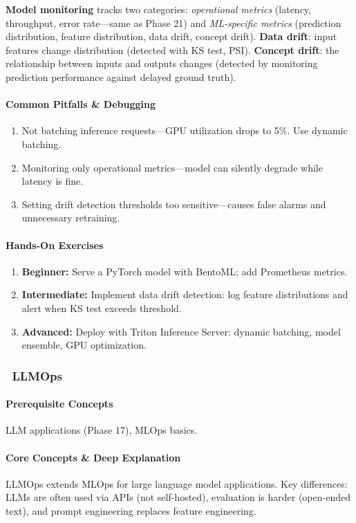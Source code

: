 \documentclass[11pt, a4paper, oneside]{report}
\newcommand{\mustmaster}[1]{\subsubsection{\texorpdfstring{\fcolorbox{blue!40!black}{blue!8}{\footnotesize\bfseries\color{blue!40!black} MUST MASTER}~#1}{#1}}}
\begin{document}
\textbf{Model monitoring} tracks two categories: \emph{operational metrics} (latency, throughput, error rate---same as Phase 21) and \emph{ML-specific metrics} (prediction distribution, feature distribution, data drift, concept drift). \textbf{Data drift}: input features change distribution (detected with KS test, PSI). \textbf{Concept drift}: the relationship between inputs and outputs changes (detected by monitoring prediction performance against delayed ground truth).

\paragraph{Common Pitfalls \& Debugging}
\begin{enumerate}[leftmargin=*]
\item Not batching inference requests---GPU utilization drops to 5\%. Use dynamic batching.
\item Monitoring only operational metrics---model can silently degrade while latency is fine.
\item Setting drift detection thresholds too sensitive---causes false alarms and unnecessary retraining.
\end{enumerate}

\paragraph{Hands-On Exercises}
\begin{enumerate}[leftmargin=*]
\item \textbf{Beginner:} Serve a PyTorch model with BentoML; add Prometheus metrics.
\item \textbf{Intermediate:} Implement data drift detection: log feature distributions and alert when KS test exceeds threshold.
\item \textbf{Advanced:} Deploy with Triton Inference Server: dynamic batching, model ensemble, GPU optimization.
\end{enumerate}

\mustmaster{LLMOps}

\paragraph{Prerequisite Concepts} LLM applications (Phase 17), MLOps basics.

\paragraph{Core Concepts \& Deep Explanation} LLMOps extends MLOps for large language model applications. Key differences: LLMs are often used via APIs (not self-hosted), evaluation is harder (open-ended text), and prompt engineering replaces feature engineering.
\end{document}
